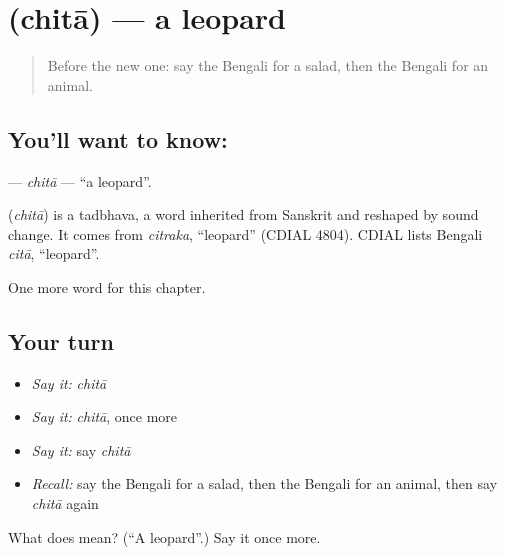 \section[\texorpdfstring{\bn{চিতা} (chitā)}{চিতা (chitā)}]{ (chitā) — a leopard}

\label{lesson:BN-C224-chita}



\begin{quote}
Before the new one: say the Bengali for a salad, then the Bengali for an animal.
\end{quote}

\subsection*{You'll want to know: }
\textbf{} — \emph{chitā} — \textquotedblleft{}a leopard\textquotedblright{}.

\begin{cousinweb}
\textbf{} (\emph{chitā}) is a tadbhava, a word inherited from Sanskrit and reshaped by sound change. It comes from \emph{citraka}, \textquotedblleft{}leopard\textquotedblright{} (CDIAL 4804). CDIAL lists Bengali \emph{citā}, \textquotedblleft{}leopard\textquotedblright{}.
\end{cousinweb}

\begin{grammarlens}[title={What you've built}]
One more word for this chapter.
\end{grammarlens}

\subsection*{Your turn}
\begin{itemize}
\raggedright
  \item \emph{Say it:} \emph{chitā}
  \item \emph{Say it:} \emph{chitā}, once more
  \item \emph{Say it:} say \emph{chitā}
  \item \emph{Recall:} say the Bengali for a salad, then the Bengali for an animal, then say \emph{chitā} again
\end{itemize}

\begin{tcolorbox}[breakable,colback=teal!4,colframe=teal!35!black,title={Before you move on}]
What does  mean? (\textquotedblleft{}A leopard\textquotedblright{}.) Say it once more.
\end{tcolorbox}
